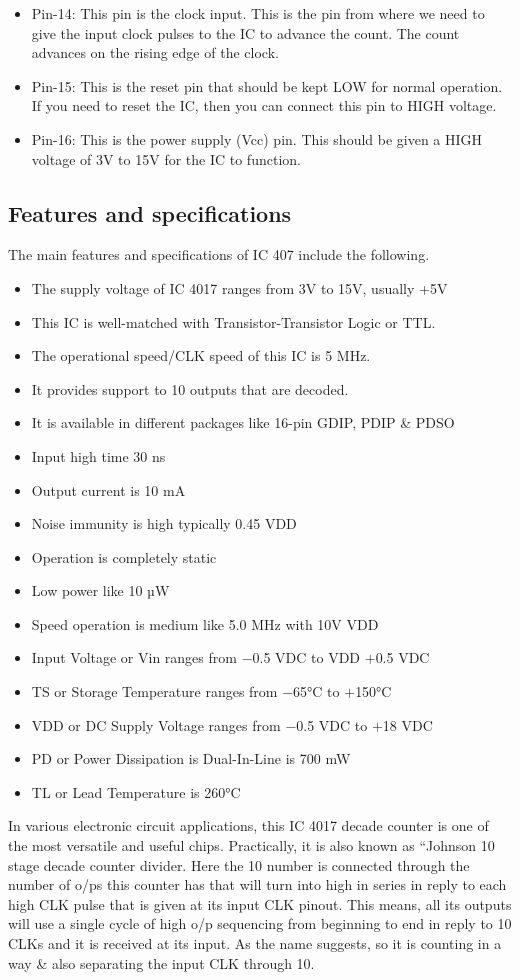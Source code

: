 \documentclass[pstricks,border=11pt]{article}
\begin{document}
\begin{itemize}
    \item Pin-14: This pin is the clock input. This is the pin from where we need to give the input clock pulses to the IC to advance the count. The count advances on the rising edge of the clock.
    \item Pin-15: This is the reset pin that should be kept LOW for normal operation. If you need to reset the IC, then you can connect this pin to HIGH voltage.
    \item Pin-16: This is the power supply (Vcc) pin. This should be given a HIGH voltage of 3V to 15V for the IC to function.
\end{itemize}

\subsection{Features and specifications}
The main features and specifications of IC 407 include the following.
\begin{itemize}
    \item The supply voltage of IC 4017 ranges from 3V to 15V, usually +5V
    \item This IC is well-matched with Transistor-Transistor Logic or TTL.
    \item The operational speed/CLK speed of this IC is 5 MHz.
    \item It provides support to 10 outputs that are decoded.
    \item It is available in different packages like 16-pin GDIP, PDIP \& PDSO
    \item Input high time 30 ns
    \item Output current is 10 mA
    \item Noise immunity is high typically 0.45 VDD
    \item Operation is completely static
    \item Low power like 10 µW
    \item Speed operation is medium like 5.0 MHz with 10V VDD
    \item Input Voltage or Vin ranges from $-$0.5 VDC to VDD $+$0.5 VDC
    \item TS or Storage Temperature ranges from $-$65°C to $+$150°C
    \item VDD or DC Supply Voltage ranges from $-$0.5 VDC to $+$18 VDC
    \item PD or Power Dissipation is Dual-In-Line is 700 mW
    \item TL or Lead Temperature is 260°C
\end{itemize}
\hfill \break
In various electronic circuit applications, this IC 4017 decade counter is one of the most versatile and useful chips. Practically, it is also known as “Johnson 10 stage decade counter divider. Here the 10 number is connected through the number of o/ps this counter has that will turn into high in series in reply to each high CLK pulse that is given at its input CLK pinout. This means, all its outputs will use a single cycle of high o/p sequencing from beginning to end in reply to 10 CLKs and it is received at its input. As the name suggests, so it is counting in a way \& also separating the input CLK through 10.
\end{document}
